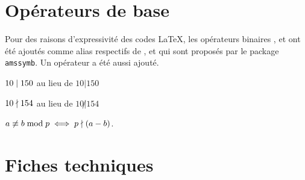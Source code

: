 \documentclass[12pt,a4paper]{article}
\begin{document}
\section{Opérateurs de base}

Pour des raisons d'expressivité des codes \LaTeX{}, les opérateurs binaires ,  et  ont été ajoutés comme alias respectifs de ,  et  qui sont proposés par le package \verb+amssymb+. Un opérateur  a été aussi ajouté.

\begin{latexex}
$10 \mid 150$ au lieu de
$10 | 150$

$10 \nmid 154$ au lieu de
$10 \not| 154$

$a \nequiv b \modulo p
 \iff
 p \ndivides (a - b)$.
\end{latexex}




\section{Fiches techniques}



\extraspace


\extraspace

\end{document}
